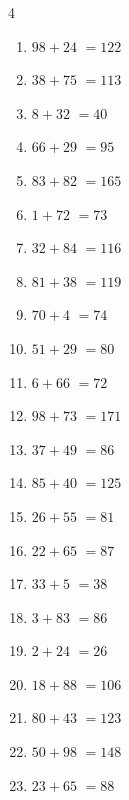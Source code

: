 \begin{multicols}{4}
\begin{enumerate}
  \item $98+24$
        $=122$

  \item $38+75$
        $=113$

  \item $8+32$
        $=40$

\columnbreak %

  \item $66+29$
        $=95$

  \item $83+82$
        $=165$

  \item $1+72$
        $=73$

  \item $32+84$
        $=116$

  \item $81+38$
        $=119$

  \item $70+4$
        $=74$

  \item $51+29$
        $=80$

  \item $6+66$
        $=72$

  \item $98+73$
        $=171$

  \item $37+49$
        $=86$

  \item $85+40$
        $=125$

  \item $26+55$
        $=81$

  \item $22+65$
        $=87$

  \item $33+5$
        $=38$

  \item $3+83$
        $=86$

  \item $2+24$
        $=26$

  \item $18+88$
        $=106$

  \item $80+43$
        $=123$

  \item $50+98$
        $=148$

  \item $23+65$
        $=88$


\end{enumerate}
\end{multicols}
